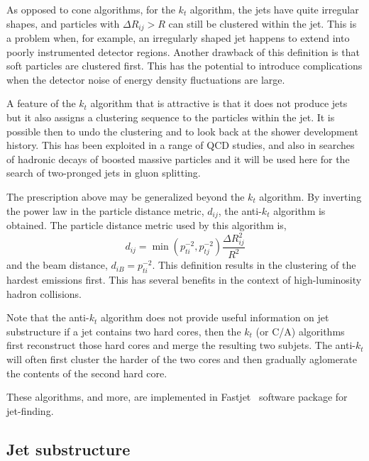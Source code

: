 As opposed to cone algorithms, for the $k_t$ algorithm, the jets have quite irregular shapes, and particles with $\Delta R_{ij} > R$ can still be clustered within the jet. This is a problem when, for example, an irregularly shaped jet happens to extend into poorly instrumented detector regions. Another drawback of this definition is that soft particles are clustered first. This  has the potential to introduce complications when the detector noise of energy density fluctuations are large.

A feature of the $k_t$ algorithm that is attractive is that it does not produce jets but it also assigns a clustering sequence to the particles within the jet. It is possible then to undo the clustering and to look %
back at the shower development history.  This has been exploited in a range of QCD studies, and also in searches of hadronic decays of boosted massive particles  and it will be used here for the search of two-pronged jets in gluon splitting.

The prescription above may be generalized beyond the $k_t$ algorithm. By inverting the power law in the particle distance metric, $d_{ij}$, the anti-$k_t$ algorithm is obtained. The particle distance metric used by this algorithm is,
\begin{equation} 
d_{ij} = \min(p^{-2}_{ti},p^{-2}_{tj}) \frac{\Delta R^2_{ij}}{R^2}
\label{eqn:antikt}
\end{equation}
and the  beam distance, $d_{iB}=p^{-2}_{ti}$. This definition results in the clustering of the hardest emissions first. This has several benefits in the context of high-luminosity hadron collisions.

Note that the anti-$k_t$ algorithm does not provide useful information on jet substructure if a jet contains two hard cores, then the $k_t$ (or C/A) algorithms first reconstruct those hard cores and merge the resulting two subjets. The anti-$k_t$ will often first cluster the harder of the two cores and then gradually aglomerate the contents of the second hard core.

These algorithms, and more, are implemented in {\sc Fastjet}~\cite{fastjet} software package for jet-finding. 


\subsection{Jet substructure}\label{sec:substructure}

